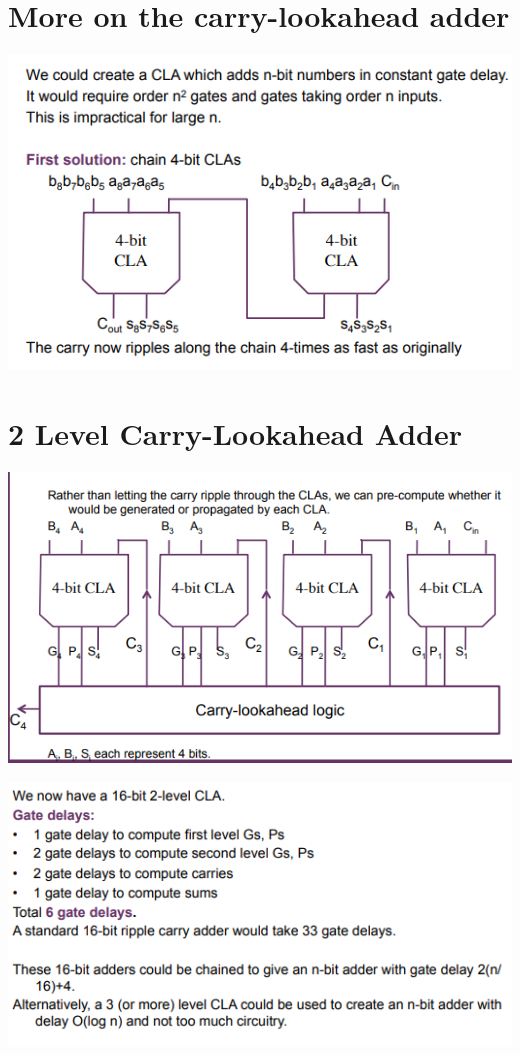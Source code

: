 \documentclass{article}[18pt]
\begin{document}
\section{More on the carry-lookahead adder}
\begin{center}
	\includegraphics[scale=0.7]{carry-lookahead21}
\end{center}
\section{2 Level Carry-Lookahead Adder}
\begin{center}
	\includegraphics[scale=0.7]{2-level-lookahead}
\end{center}
\begin{center}
	\includegraphics[scale=0.7]{2-level-lookahead1}
\end{center}
\end{document}
